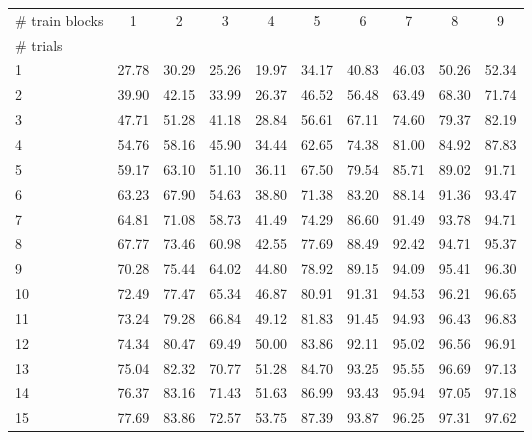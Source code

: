 \begin{tabularx}{\textwidth}{@{}Xccccccccc@{}}
\toprule
\# train blocks & 1 & 2 & 3 & 4 & 5 & 6 & 7 & 8 & 9 \\
\# trials &  &  &  &  &  &  &  &  &  \\
\midrule
1 & 27.78 & 30.29 & 25.26 & 19.97 & 34.17 & 40.83 & 46.03 & 50.26 & 52.34 \\
2 & 39.90 & 42.15 & 33.99 & 26.37 & 46.52 & 56.48 & 63.49 & 68.30 & 71.74 \\
3 & 47.71 & 51.28 & 41.18 & 28.84 & 56.61 & 67.11 & 74.60 & 79.37 & 82.19 \\
4 & 54.76 & 58.16 & 45.90 & 34.44 & 62.65 & 74.38 & 81.00 & 84.92 & 87.83 \\
5 & 59.17 & 63.10 & 51.10 & 36.11 & 67.50 & 79.54 & 85.71 & 89.02 & 91.71 \\
6 & 63.23 & 67.90 & 54.63 & 38.80 & 71.38 & 83.20 & 88.14 & 91.36 & 93.47 \\
7 & 64.81 & 71.08 & 58.73 & 41.49 & 74.29 & 86.60 & 91.49 & 93.78 & 94.71 \\
8 & 67.77 & 73.46 & 60.98 & 42.55 & 77.69 & 88.49 & 92.42 & 94.71 & 95.37 \\
9 & 70.28 & 75.44 & 64.02 & 44.80 & 78.92 & 89.15 & 94.09 & 95.41 & 96.30 \\
10 & 72.49 & 77.47 & 65.34 & 46.87 & 80.91 & 91.31 & 94.53 & 96.21 & 96.65 \\
11 & 73.24 & 79.28 & 66.84 & 49.12 & 81.83 & 91.45 & 94.93 & 96.43 & 96.83 \\
12 & 74.34 & 80.47 & 69.49 & 50.00 & 83.86 & 92.11 & 95.02 & 96.56 & 96.91 \\
13 & 75.04 & 82.32 & 70.77 & 51.28 & 84.70 & 93.25 & 95.55 & 96.69 & 97.13 \\
14 & 76.37 & 83.16 & 71.43 & 51.63 & 86.99 & 93.43 & 95.94 & 97.05 & 97.18 \\
15 & 77.69 & 83.86 & 72.57 & 53.75 & 87.39 & 93.87 & 96.25 & 97.31 & 97.62 \\
\bottomrule
\end{tabularx}
